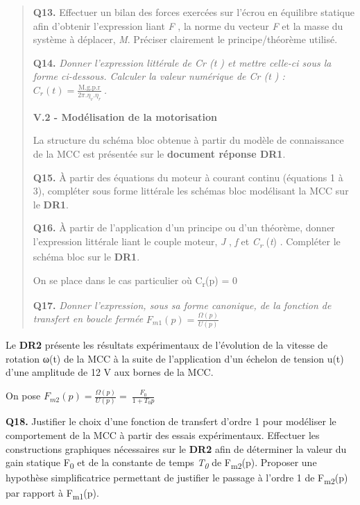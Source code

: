 \documentclass[]{article}
\begin{document}
\begin{quote}
\textbf{Q13.} Effectuer un bilan des forces exercées sur l'écrou en
équilibre statique afin d'obtenir l'expression liant \emph{F} , la norme
du vecteur \emph{F} et la masse du système à déplacer, \emph{M}.
Préciser clairement le principe/théorème utilisé.

\textbf{Q14.} \emph{Donner l'expression littérale de Cr (t ) et mettre
celle-ci sous la forme ci-dessous. Calculer la valeur numérique de Cr (t
) :}
\(C_{r}(t) = \frac{\text{M.g.p.r}}{2\pi.\eta_{v}.\eta_{r}}\ \)\emph{.}

\textbf{V.2 - Modélisation de la motorisation}

La structure du schéma bloc obtenue à partir du modèle de connaissance
de la MCC est présentée sur le \textbf{document réponse DR1}.

\textbf{Q15.} À partir des équations du moteur à courant continu
(équations 1 à 3), compléter sous forme littérale les schémas bloc
modélisant la MCC sur le \textbf{DR1}.

\textbf{Q16.} À partir de l'application d'un principe ou d'un théorème,
donner l'expression littérale liant le couple moteur, \emph{J} ,
\emph{f} et \emph{C\textsubscript{r}} (\emph{t}) . Compléter le schéma
bloc sur le \textbf{DR1}.

On se place dans le cas particulier où C\textsubscript{r}(p) = 0

\textbf{Q17.} \emph{Donner l'expression, sous sa forme canonique, de la
fonction de transfert en boucle fermée}
\(F_{m1}(p) = \frac{\Omega(p)}{U(p)}\ \)
\end{quote}

\protect\hypertarget{page10}{}{}Le \textbf{DR2} présente les résultats
expérimentaux de l'évolution de la vitesse de rotation ω(t) de la MCC à
la suite de l'application d'un échelon de tension u(t) d'une amplitude
de 12 V aux bornes de la MCC.

On pose
\(F_{m2}\left( p \right) = \frac{\Omega\left( p \right)}{U\left( p \right)} = \ \frac{F_{0}}{1 + T_{0}p}\)

\textbf{Q18.} Justifier le choix d'une fonction de transfert d'ordre 1
pour modéliser le comportement de la MCC à partir des essais
expérimentaux. Effectuer les constructions graphiques nécessaires sur le
\textbf{DR2} afin de déterminer la valeur du gain statique
F\textsubscript{0} et de la constante de temps \emph{T\textsubscript{0}}
de F\textsubscript{m2}(p). Proposer une hypothèse simplificatrice
permettant de justifier le passage à l'ordre 1 de F\textsubscript{m2}(p)
par rapport à F\textsubscript{m1}(p).
\end{document}

